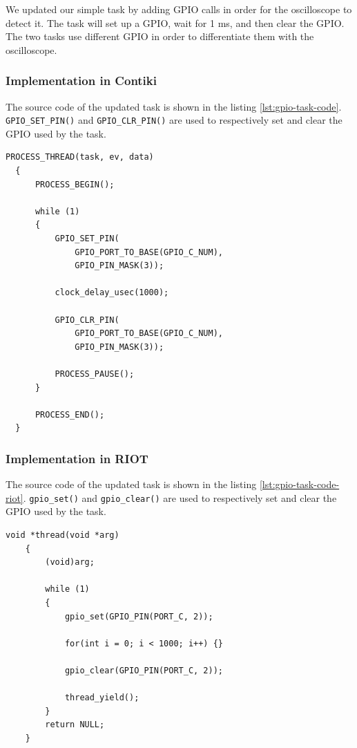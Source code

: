 We updated our simple task by adding GPIO calls in order for the oscilloscope to detect it.
The task will set up a GPIO, wait for 1 ms, and then clear the GPIO.
The two tasks use different GPIO in order to differentiate them with the oscilloscope.

\subsubsection{Implementation in Contiki}
The source code of the updated task is shown in the listing \ref{lst:gpio-task-code}.
\texttt{GPIO\_SET\_PIN()} and \texttt{GPIO\_CLR\_PIN()} are used to respectively set and clear the GPIO used by the task.

\begin{lstlisting}[style=CStyle, float, label={lst:gpio-task-code}, caption={source code of the task with GPIO calls}]
  PROCESS_THREAD(task, ev, data)
  {
      PROCESS_BEGIN();
  
      while (1)
      {
          GPIO_SET_PIN(
              GPIO_PORT_TO_BASE(GPIO_C_NUM), 
              GPIO_PIN_MASK(3));

          clock_delay_usec(1000);

          GPIO_CLR_PIN(
              GPIO_PORT_TO_BASE(GPIO_C_NUM), 
              GPIO_PIN_MASK(3));

          PROCESS_PAUSE();
      }
  
      PROCESS_END();
  }
\end{lstlisting}

\subsubsection{Implementation in RIOT}
The source code of the updated task is shown in the listing \ref{lst:gpio-task-code-riot}.
\texttt{gpio\_set()} and \texttt{gpio\_clear()} are used to respectively set and clear the GPIO used by the task.

\begin{lstlisting}[style=CStyle, float, label={lst:gpio-task-code-riot}, caption={source code of a task implemented in RIOT for the simple application}]
    void *thread(void *arg)
    {
        (void)arg;
    
        while (1)
        {
            gpio_set(GPIO_PIN(PORT_C, 2));

            for(int i = 0; i < 1000; i++) {}

            gpio_clear(GPIO_PIN(PORT_C, 2));

            thread_yield();
        }
        return NULL;
    }
\end{lstlisting}


